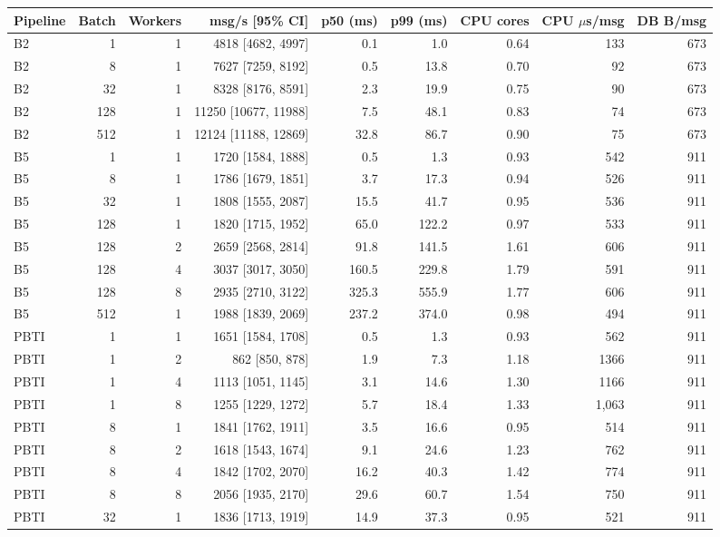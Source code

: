\begin{tabular}{lrrrrrrrr}
\toprule
\textbf{Pipeline} & \textbf{Batch} & \textbf{Workers} & \textbf{msg/s [95\% CI]} & \textbf{p50 (ms)} & \textbf{p99 (ms)} & \textbf{CPU cores} & \textbf{CPU $\mu$s/msg} & \textbf{DB B/msg}\\
\midrule
B2 & 1 & 1 & 4818 [4682, 4997] & 0.1 & 1.0 & 0.64 & 133 & 673\\
B2 & 8 & 1 & 7627 [7259, 8192] & 0.5 & 13.8 & 0.70 & 92 & 673\\
B2 & 32 & 1 & 8328 [8176, 8591] & 2.3 & 19.9 & 0.75 & 90 & 673\\
B2 & 128 & 1 & 11250 [10677, 11988] & 7.5 & 48.1 & 0.83 & 74 & 673\\
B2 & 512 & 1 & 12124 [11188, 12869] & 32.8 & 86.7 & 0.90 & 75 & 673\\
B5 & 1 & 1 & 1720 [1584, 1888] & 0.5 & 1.3 & 0.93 & 542 & 911\\
B5 & 8 & 1 & 1786 [1679, 1851] & 3.7 & 17.3 & 0.94 & 526 & 911\\
B5 & 32 & 1 & 1808 [1555, 2087] & 15.5 & 41.7 & 0.95 & 536 & 911\\
B5 & 128 & 1 & 1820 [1715, 1952] & 65.0 & 122.2 & 0.97 & 533 & 911\\
B5 & 128 & 2 & 2659 [2568, 2814] & 91.8 & 141.5 & 1.61 & 606 & 911\\
B5 & 128 & 4 & 3037 [3017, 3050] & 160.5 & 229.8 & 1.79 & 591 & 911\\
B5 & 128 & 8 & 2935 [2710, 3122] & 325.3 & 555.9 & 1.77 & 606 & 911\\
B5 & 512 & 1 & 1988 [1839, 2069] & 237.2 & 374.0 & 0.98 & 494 & 911\\
PBTI & 1 & 1 & 1651 [1584, 1708] & 0.5 & 1.3 & 0.93 & 562 & 911\\
PBTI & 1 & 2 & 862 [850, 878] & 1.9 & 7.3 & 1.18 & 1366 & 911\\
PBTI & 1 & 4 & 1113 [1051, 1145] & 3.1 & 14.6 & 1.30 & 1166 & 911\\
PBTI & 1 & 8 & 1255 [1229, 1272] & 5.7 & 18.4 & 1.33 & 1{,}063 & 911\\
PBTI & 8 & 1 & 1841 [1762, 1911] & 3.5 & 16.6 & 0.95 & 514 & 911\\
PBTI & 8 & 2 & 1618 [1543, 1674] & 9.1 & 24.6 & 1.23 & 762 & 911\\
PBTI & 8 & 4 & 1842 [1702, 2070] & 16.2 & 40.3 & 1.42 & 774 & 911\\
PBTI & 8 & 8 & 2056 [1935, 2170] & 29.6 & 60.7 & 1.54 & 750 & 911\\
PBTI & 32 & 1 & 1836 [1713, 1919] & 14.9 & 37.3 & 0.95 & 521 & 911\\

\end{tabular}

